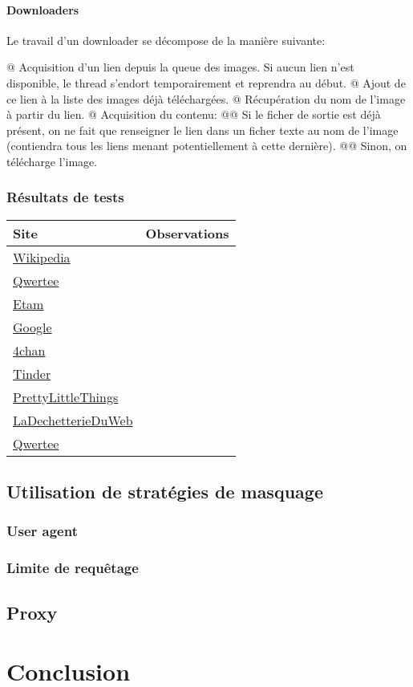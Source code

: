 \documentclass[hideweeklyreports,noposter]{polytech/polytech}
\begin{document}
			\subsection{Downloaders}
				Le travail d'un downloader se décompose de la manière suivante:
				\begin{easylist}
					@ Acquisition d'un lien depuis la queue des images.
					Si aucun lien n'est disponible, le thread s'endort temporairement et reprendra au début.
					@ Ajout de ce lien à la liste des images déjà téléchargées.
					@ Récupération du nom de l'image à partir du lien.
					@ Acquisition du contenu:
					@@ Si le ficher de sortie est déjà présent, on ne fait que renseigner le lien dans un ficher texte au nom de l'image (contiendra tous les liens menant potentiellement à cette dernière).
					@@ Sinon, on télécharge l'image.
				\end{easylist}
				
		\section{Résultats de tests}
			\begin{center}
				\centering
				\begin{tabularx}{\textwidth}{|X|X|}
					\hline
					Site & Observations\\\hline
					\href{https://en.wikipedia.org/wiki/Main_Page}{Wikipedia} & \\\hline
					\href{https://www.qwertee.com/}{Qwertee} & \\\hline
					\href{https://www.etam.com/}{Etam} & \\\hline
					\href{https://www.google.com/}{Google} & \\\hline
					\href{https://www.4chan.org/}{4chan} & \\\hline
					\href{https://tinder.com/}{Tinder} & \\\hline
					\href{https://www.prettylittlethings.fr/}{PrettyLittleThings} & \\\hline
					\href{https://www.ladechetterieduweb.com/}{LaDechetterieDuWeb} & \\\hline
					\href{https://www.qwertee.com/}{Qwertee} & \\\hline
				\end{tabularx}
			\end{center}
	
	\chapter{Utilisation de stratégies de masquage}
		\section{User agent}
		\section{Limite de requêtage}
	
	\chapter{Proxy}
		

\part{Conclusion}

\appendix		
\end{document}
